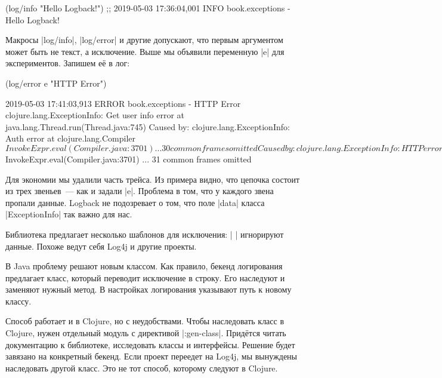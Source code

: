 \begin{english}
  \begin{clojure}
(log/info "Hello Logback!")
;; 2019-05-03 17:36:04,001 INFO book.exceptions - Hello Logback!
  \end{clojure}
\end{english}

\label{log-ex-param}

Макросы \spverb|log/info|, \spverb|log/error| и другие допускают, что первым
аргументом может быть не текст, а исключение. Выше мы объявили переменную
\spverb|e| для экспериментов. Запишем е\"{е} в лог:

\begin{english}
  \begin{clojure}
(log/error e "HTTP Error")

2019-05-03 17:41:03,913 ERROR book.exceptions - HTTP Error
clojure.lang.ExceptionInfo: Get user info error
    at java.lang.Thread.run(Thread.java:745)
Caused by: clojure.lang.ExceptionInfo: Auth error
    at clojure.lang.Compiler$InvokeExpr.eval(Compiler.java:3701)
    ... 30 common frames omitted
Caused by: clojure.lang.ExceptionInfo: HTTP error
    at clojure.lang.Compiler$InvokeExpr.eval(Compiler.java:3701)
    ... 31 common frames omitted
  \end{clojure}
\end{english}

Для экономии мы удалили часть трейса. Из примера видно, что цепочка состоит из
трех звеньев~--- как и задали \spverb|e|. Проблема в том, что у каждого звена
пропали данные. Logback не подозревает о том, что поле \spverb|data| класса
\spverb|ExceptionInfo| так важно для нас.


Библиотека предлагает несколько шаблонов для исключения: \spverb|%
\spverb|%
игнорируют данные. Похоже ведут себя Log4j и другие проекты.

В Java проблему решают новым классом. Как правило, бекенд логирования предлагает
класс, который переводит исключение в строку. Его наследуют и заменяют нужный
метод. В настройках логирования указывают путь к новому классу.

Способ работает и в Clojure, но с неудобствами. Чтобы наследовать класс в
Clojure, нужен отдельный модуль с директивой \spverb|:gen-class|. Прид\"{е}тся
читать документацию к библиотеке, исследовать классы и интерфейсы. Решение будет
завязано на конкретный бекенд. Если проект переедет на Log4j, мы вынуждены
наследовать другой класс. Это не тот способ, которому следуют в Clojure.

